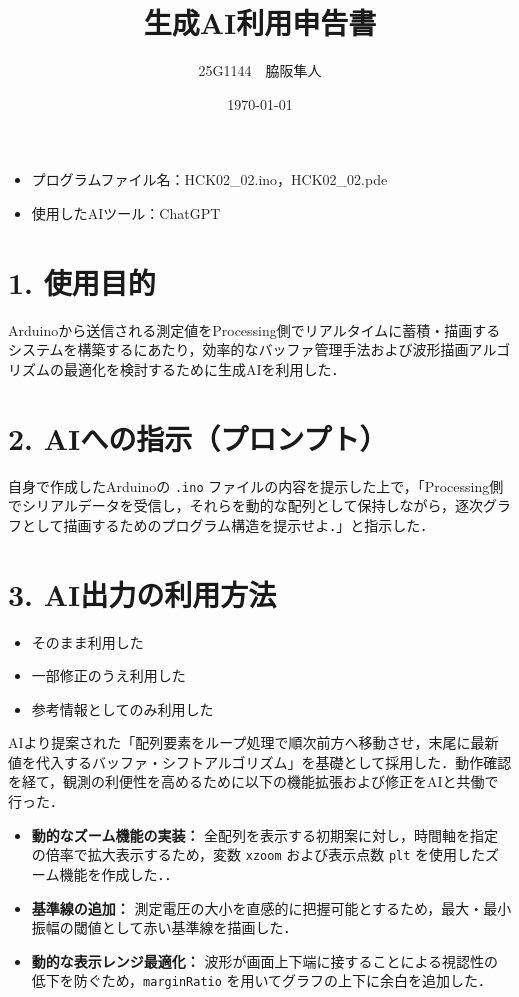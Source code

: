 \documentclass[uplatex]{jsarticle}
\title{生成AI利用申告書}
\author{25G1144　脇阪隼人}
\date{\today}
\begin{document}
\maketitle

\begin{itemize}
  \item プログラムファイル名：HCK02\_02.ino，HCK02\_02.pde
  \item 使用したAIツール：ChatGPT
\end{itemize}

\section*{1. 使用目的}
Arduinoから送信される測定値をProcessing側でリアルタイムに蓄積・描画するシステムを構築するにあたり，効率的なバッファ管理手法および波形描画アルゴリズムの最適化を検討するために生成AIを利用した．

\section*{2. AIへの指示（プロンプト）}
自身で作成したArduinoの \texttt{.ino} ファイルの内容を提示した上で，「Processing側でシリアルデータを受信し，それらを動的な配列として保持しながら，逐次グラフとして描画するためのプログラム構造を提示せよ．」と指示した．

\section*{3. AI出力の利用方法}
\begin{itemize}
    \renewcommand{\labelitemi}{} 
    \item \Square そのまま利用した
    \item \CheckedBox 一部修正のうえ利用した
    \item \Square 参考情報としてのみ利用した
\end{itemize}
AIより提案された「配列要素をループ処理で順次前方へ移動させ，末尾に最新値を代入するバッファ・シフトアルゴリズム」を基礎として採用した．動作確認を経て，観測の利便性を高めるために以下の機能拡張および修正をAIと共働で行った．
\begin{itemize}
	\item \textbf{動的なズーム機能の実装：} 全配列を表示する初期案に対し，時間軸を指定の倍率で拡大表示するため，変数 \texttt{xzoom} および表示点数 \texttt{plt} を使用したズーム機能を作成した．．
	\item \textbf{基準線の追加：} 測定電圧の大小を直感的に把握可能とするため，最大・最小振幅の閾値として赤い基準線を描画した．
	\item \textbf{動的な表示レンジ最適化：} 波形が画面上下端に接することによる視認性の低下を防ぐため，\texttt{marginRatio} を用いてグラフの上下に余白を追加した．
\end{itemize}
\end{document}

